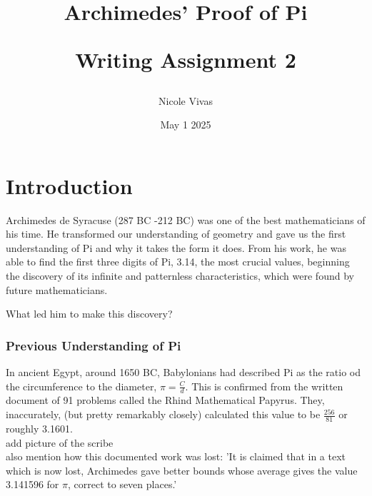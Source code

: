 \documentclass{article}
\title{Archimedes' Proof of Pi \\ 
\begin{large} 
Writing Assignment 2
\end{large}}
\author{Nicole Vivas}
\date{May 1 2025}
\begin{document}
\maketitle



\section*{Introduction}
Archimedes de Syracuse (287 BC -212 BC) was one of the best mathematicians of his time. He transformed our understanding of geometry and gave us the first understanding of Pi and why it takes the form it does. From his work, he was able to find the first three digits of Pi, 3.14, the most crucial values, beginning the discovery of its infinite and patternless characteristics, which were found by future mathematicians.\\ 

\textcolor{Periwinkle}{What led him to make this discovery?}

\subsubsection*{Previous Understanding of Pi}


In ancient Egypt, around 1650 BC, Babylonians had described Pi as the ratio od the circumference to the diameter, $\pi = \frac{C}{d}$. This is confirmed from the written document of 91 problems called the Rhind Mathematical Papyrus. They, inaccurately, (but pretty remarkably closely) calculated this value to be $\frac{256}{81}$ or roughly 3.1601. \\

\textcolor{Periwinkle}{add picture of the scribe}\\

\textcolor{Periwinkle}{also mention how this documented work was lost: 'It is claimed that in a text which is now lost, Archimedes gave better bounds whose average gives the value 3.141596 for $\pi$, correct to seven places.'}
\end{document}
